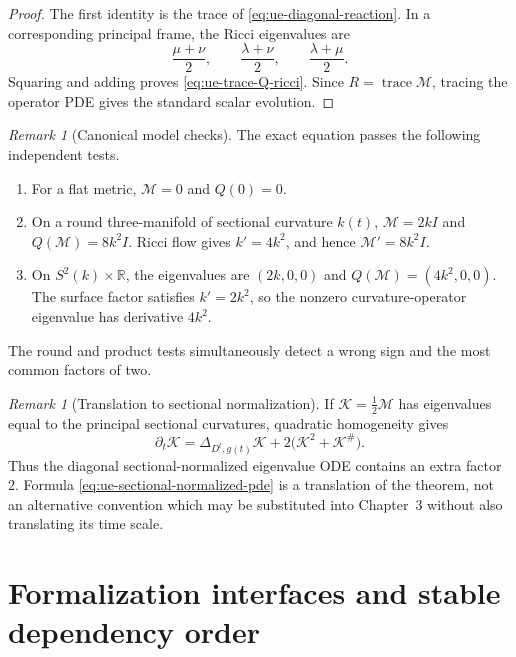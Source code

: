 \documentclass[10pt]{coll-l}
\newcommand{\trace}{\operatorname{trace}}
\theoremstyle{definition}
\theoremstyle{remark}
\newtheorem{remark}[theorem]{Remark}
\numberwithin{section}{chapter}
\numberwithin{equation}{chapter}
\begin{document}
\begin{proof}
The first identity is the trace of
\eqref{eq:ue-diagonal-reaction}.  In a corresponding principal frame, the
Ricci eigenvalues are
\[
        \frac{\mu+\nu}{2},\qquad
        \frac{\lambda+\nu}{2},\qquad
        \frac{\lambda+\mu}{2}.
\]
Squaring and adding proves \eqref{eq:ue-trace-Q-ricci}.  Since
$R=\trace\mathcal M$, tracing the operator PDE gives the standard scalar
evolution.
\end{proof}

\begin{remark}[Canonical model checks]
\label{rem:ue-model-checks}
The exact equation passes the following independent tests.
\begin{enumerate}
\item For a flat metric, $\mathcal M=0$ and $Q(0)=0$.
\item On a round three-manifold of sectional curvature $k(t)$,
      $\mathcal M=2kI$ and $Q(\mathcal M)=8k^2I$.  Ricci flow gives
      $k'=4k^2$, and hence $\mathcal M'=8k^2I$.
\item On $S^2(k)\times\mathbb R$, the eigenvalues are $(2k,0,0)$ and
      $Q(\mathcal M)=(4k^2,0,0)$.  The surface factor satisfies
      $k'=2k^2$, so the nonzero curvature-operator eigenvalue has derivative
      $4k^2$.
\end{enumerate}
The round and product tests simultaneously detect a wrong sign and the most
common factors of two.
\end{remark}

\begin{remark}[Translation to sectional normalization]
\label{rem:ue-sectional-normalization}
If $\mathcal K=\frac12\mathcal M$ has eigenvalues equal to the principal
sectional curvatures, quadratic homogeneity gives
\begin{equation}
       \partial_t\mathcal K
          =\Delta_{D^t,g(t)}\mathcal K
             +2\bigl(\mathcal K^2+\mathcal K^\#\bigr).   \label{eq:ue-sectional-normalized-pde}
\end{equation}
Thus the diagonal sectional-normalized eigenvalue ODE contains an extra
factor $2$.  Formula \eqref{eq:ue-sectional-normalized-pde} is a translation
of the theorem, not an alternative convention which may be substituted into
Chapter~3 without also translating its time scale.
\end{remark}

\section{Formalization interfaces and stable dependency order}
\label{sec:ue-formalization}
\end{document}
